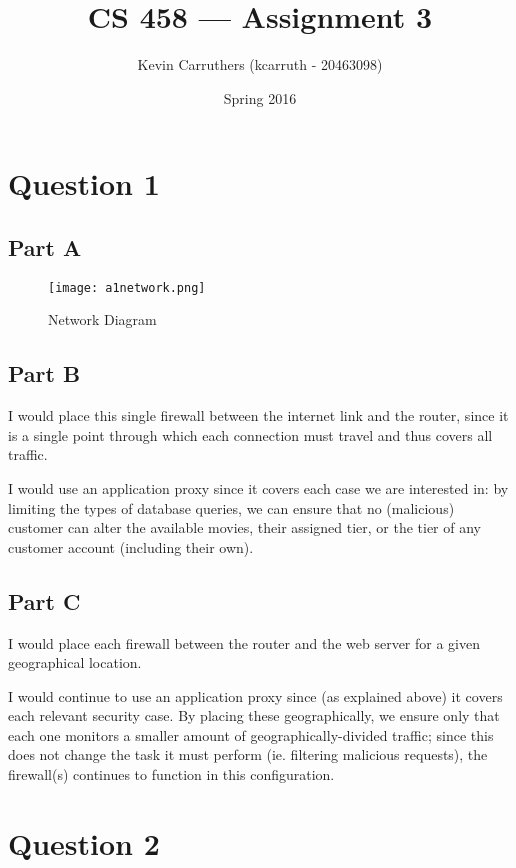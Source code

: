 \documentclass[12pt]{article}
\begin{document}
\title{CS 458 --- Assignment 3}
\author{Kevin Carruthers (kcarruth - 20463098)}
\date{\vspace{-2ex}Spring 2016}
\maketitle\HRule

\section*{Question 1}
\subsection*{Part A}
\begin{figure}[ht]
\centering
\texttt{[image: a1network.png]}
\caption{Network Diagram}
\end{figure}

\subsection*{Part B}
I would place this single firewall between the internet link and the router, since it is a single point through which each connection must travel and thus covers all traffic.

I would use an application proxy since it covers each case we are interested in: by limiting the types of database queries, we can ensure that no (malicious) customer can alter the available movies, their assigned tier, or the tier of any customer account (including their own).

\subsection*{Part C}
I would place each firewall between the router and the web server for a given geographical location.

I would continue to use an application proxy since (as explained above) it covers each relevant security case. By placing these geographically, we ensure only that each one monitors a smaller amount of geographically-divided traffic; since this does not change the task it must perform (ie. filtering malicious requests), the firewall(s) continues to function in this configuration.

\section*{Question 2}
\end{document}

